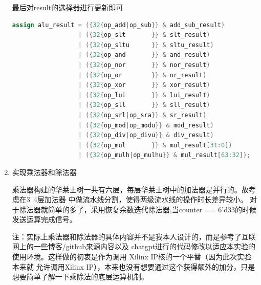 \documentclass[11pt]{article}
\begin{document}
\begin{enumerate}
  最后对result的选择器进行更新即可
  \begin{lstlisting}[language=verilog]
    assign alu_result = ({32{op_add|op_sub}} & add_sub_result)
                  | ({32{op_slt       }} & slt_result)
                  | ({32{op_sltu      }} & sltu_result)
                  | ({32{op_and       }} & and_result)
                  | ({32{op_nor       }} & nor_result)
                  | ({32{op_or        }} & or_result)
                  | ({32{op_xor       }} & xor_result)
                  | ({32{op_lui       }} & lui_result)
                  | ({32{op_sll       }} & sll_result)
                  | ({32{op_srl|op_sra}} & sr_result)
                  | ({32{op_mod|op_modu}} & mod_result)
                  | ({32{op_div|op_divu}} & div_result)
                  | ({32{op_mul       }} & mul_result[31:0])
                  | ({32{op_mulh|op_mulhu}} & mul_result[63:32]);

  \end{lstlisting}

  \item 实现乘法器和除法器
  
  乘法器构建的华莱士树一共有六层，每层华莱士树中的加法器是并行的。故考虑在3~4层加法器
  中做流水线分割，使得两级流水线的操作时长差异较小。
  对于除法器就简单的多了，采用恢复余数迭代除法器,当counter == 6'd33的时候发送运算完成信号。\par


  注：实际上乘法器和除法器的具体内容并不是我本人设计的，而是参考了互联网上的一些博客/github来源内容以及
  chatgpt进行的代码修改以适应本实验的使用环境。这样做的初衷是作为调用 Xilinx IP核的一个平替（因为此次实验本来就
  允许调用Xilinx IP），本来也没有想要通过这个获得额外的加分，只是想要简单了解一下乘除法的底层运算机制。

\end{enumerate}
\end{document}
